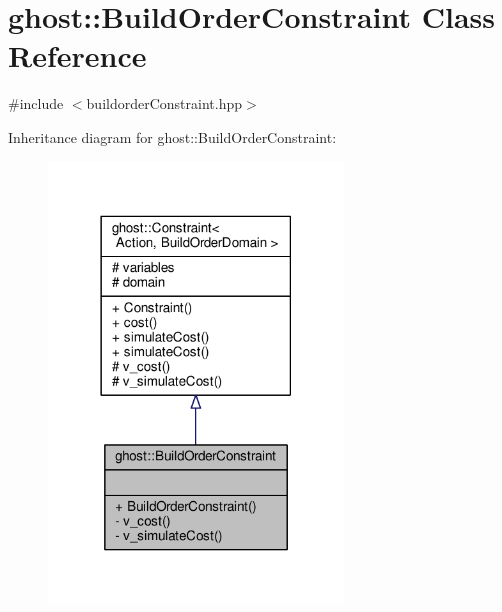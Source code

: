 \hypertarget{classghost_1_1BuildOrderConstraint}{\section{ghost\-:\-:Build\-Order\-Constraint Class Reference}
\label{classghost_1_1BuildOrderConstraint}
}


{\ttfamily \#include $<$buildorder\-Constraint.\-hpp$>$}



Inheritance diagram for ghost\-:\-:Build\-Order\-Constraint\-:
\nopagebreak
\begin{figure}[H]
\begin{center}
\leavevmode
\includegraphics[width=222pt]{classghost_1_1BuildOrderConstraint__inherit__graph}
\end{center}
\end{figure}


